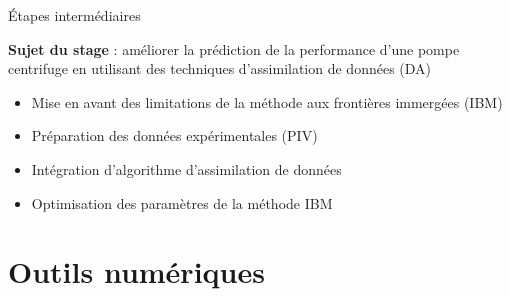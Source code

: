 \documentclass[10pt, aspectratio=169, dvipsnames]{beamer}
\begin{document}
    \begin{frame}[t]{Étapes intermédiaires}

        \textbf{Sujet du stage} : améliorer la prédiction de la performance d'une pompe centrifuge en utilisant des techniques d'assimilation de données (DA)

        \vspace{1.2cm}

        \begin{itemize}
            \item Mise en avant des limitations de la méthode aux frontières immergées (IBM)
            \item Préparation des données expérimentales (PIV)
            \item Intégration d'algorithme d'assimilation de données
            \item Optimisation des paramètres de la méthode IBM
        \end{itemize}
    \end{frame}




\section{Outils numériques} 
\end{document}
